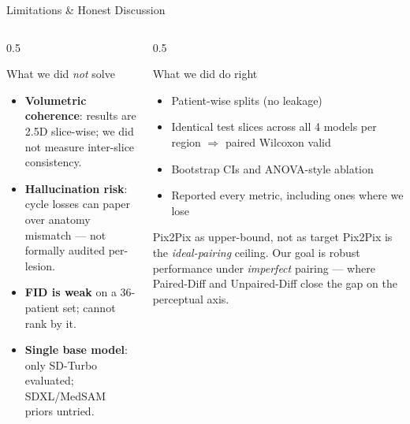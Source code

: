 \documentclass[aspectratio=169,10pt]{beamer}
\begin{document}
\begin{frame}{Limitations \& Honest Discussion}
\footnotesize
\begin{columns}[T]
\begin{column}{0.5\textwidth}
\begin{alertblock}{What we did \emph{not} solve}
\begin{itemize}
    \item \textbf{Volumetric coherence}: results are 2.5D slice-wise; we did not measure inter-slice consistency.
    \item \textbf{Hallucination risk}: cycle losses can paper over anatomy mismatch --- not formally audited per-lesion.
    \item \textbf{FID is weak} on a 36-patient set; cannot rank by it.
    \item \textbf{Single base model}: only SD-Turbo evaluated; SDXL/MedSAM priors untried.
\end{itemize}
\end{alertblock}
\end{column}
\begin{column}{0.5\textwidth}
\begin{block}{What we did do right}
\begin{itemize}
    \item Patient-wise splits (no leakage)
    \item Identical test slices across all 4 models per region $\Rightarrow$ paired Wilcoxon valid
    \item Bootstrap CIs and ANOVA-style ablation
    \item Reported every metric, including ones where we lose
\end{itemize}
\end{block}
\begin{block}{Pix2Pix as upper-bound, not as target}
\scriptsize
Pix2Pix is the \emph{ideal-pairing} ceiling. Our goal is robust performance under \emph{imperfect} pairing --- where Paired-Diff and Unpaired-Diff close the gap on the perceptual axis.
\end{block}
\end{column}
\end{columns}
\end{frame}


\end{document}
